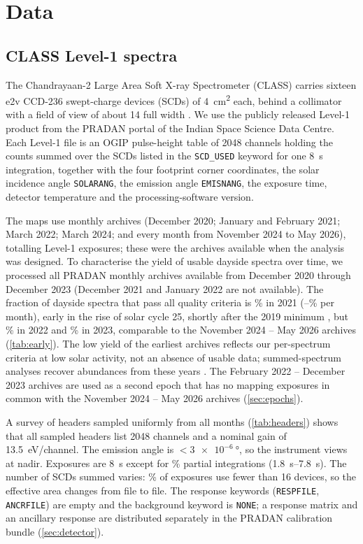 \section{Data}\label{sec:data}

\subsection{CLASS Level-1 spectra}\label{sec:class}
The Chandrayaan-2 Large Area Soft X-ray Spectrometer (CLASS) carries sixteen e2v CCD-236 swept-charge devices (SCDs) of \SI{4}{cm^2} each, behind a collimator with a field of view of about 14\textdegree{} full width \citep{Narendranath2014,Radhakrishna2020,Pillai2021}. We use the publicly released Level-1 product from the PRADAN portal of the Indian Space Science Data Centre. Each Level-1 file is an OGIP pulse-height table of 2048 channels holding the counts summed over the SCDs listed in the \texttt{SCD\_USED} keyword for one \SI{8}{s} integration, together with the four footprint corner coordinates, the solar incidence angle \texttt{SOLARANG}, the emission angle \texttt{EMISNANG}, the exposure time, detector temperature and the processing-software version.

The maps use \NMonths{} monthly archives (December 2020; January and February 2021; March 2022; March 2024; and every month from November 2024 to May 2026), totalling \NRawFiles{} Level-1 exposures; these were the archives available when the analysis was designed. To characterise the yield of usable dayside spectra over time, we processed all \NArchEarly{} PRADAN monthly archives available from December 2020 through December 2023 (December 2021 and January 2022 are not available). The fraction of dayside spectra that pass all quality criteria is \PassYrTwentyOne\% in 2021 (\PassYrTwentyOneLo--\PassYrTwentyOneHi\% per month), early in the rise of solar cycle 25, shortly after the 2019 minimum \citep{Hathaway2015}, but \PassYrTwentyTwo\% in 2022 and \PassYrTwentyThree\% in 2023, comparable to the November 2024 -- May 2026 archives (\cref{tab:early}). The low yield of the earliest archives reflects our per-spectrum criteria at low solar activity, not an absence of usable data; summed-spectrum analyses recover abundances from these years \citep{Narendranath2024}. The February 2022 -- December 2023 archives are used as a second epoch that has no mapping exposures in common with the November 2024 -- May 2026 archives (\cref{sec:epochs}).

A survey of \NHeaderSample{} headers sampled uniformly from all months (\cref{tab:headers}) shows that all sampled headers list 2048 channels and a nominal gain of \SI{13.5}{eV/channel}. The emission angle is $<\SI{3e-6}{\degree}$, so the instrument views at nadir. Exposures are \SI{8}{s} except for \PctPartialExp{}\% partial integrations (\SIrange{1.8}{7.8}{s}). The number of SCDs summed varies: \PctNotAllSCD{}\% of exposures use fewer than 16 devices, so the effective area changes from file to file. The response keywords (\texttt{RESPFILE}, \texttt{ANCRFILE}) are empty and the background keyword is \texttt{NONE}; a response matrix and an ancillary response are distributed separately in the PRADAN calibration bundle (\cref{sec:detector}).

